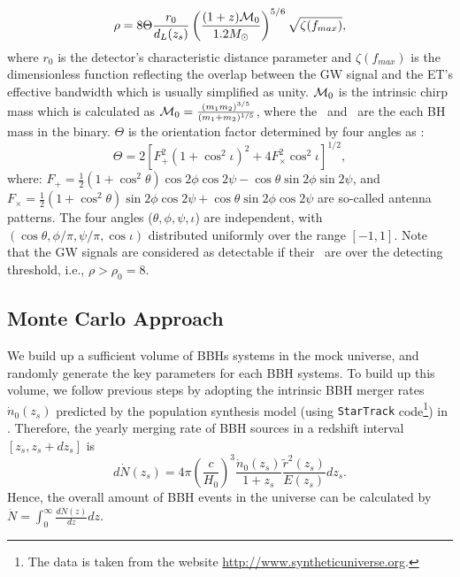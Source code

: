 \documentclass[twocolumn]{aastex62}
\begin{document}
\begin{equation} \label{SNR}
\rho = 8 \Theta \frac{r_0}{d_L(z_s)} \left( \frac{(1+z){\cal M}_0}{1.2 M_{\odot}} \right)^{5/6}
\sqrt {\zeta(f_{max})},
\end{equation}
where $r_0$ is the detector's characteristic distance parameter and $\zeta(f_{max})$ is the dimensionless function reflecting the overlap between the GW signal and the ET's effective bandwidth which is usually simplified as unity. ${\cal M}_0$ is the intrinsic chirp mass which is calculated as $ {\cal M}_0 = \frac{(m_1m_2)^{3/5}}{(m_1+m_2)^{1/5}}$, where the \mone\ and \mtwo\ are the each BH mass in the binary. $\Theta$ is the orientation factor determined by four angles as \citep{Finn93}:
 \begin{equation} \label{Theta}
 \Theta = 2 [ F_{+}^2(1 + \cos^2{\iota} )^2 + 4 F_{\times}^2 \cos^2{\iota} ]^{1/2},
 \end{equation}
where: $F_{+} = \frac{1}{2} (1 + \cos^2{\theta}) \cos{2\phi} \cos{2 \psi} - \cos{\theta} \sin{2 \phi} \sin{ 2 \psi}$, and
$F_{\times} = \frac{1}{2} (1 + \cos^2{\theta}) \sin{2\phi} \cos{2 \psi} + \cos{\theta} \sin{2 \phi} \cos{ 2 \psi}$ are so-called antenna patterns. The four angles ($\theta, \phi, \psi, \iota$) are independent, with $(\cos\theta, \phi/\pi, \psi/\pi, \cos\iota)$ distributed uniformly over the range $[-1, 1]$. Note that the GW signals are considered as detectable if their \snr\ are over the detecting threshold, i.e., $\rho > \rho_0 = 8$.

\subsection{Monte Carlo Approach} \label{MC}
We build up a sufficient volume of BBHs systems in the mock universe, and randomly generate the key parameters for each BBH systems. To build up this volume, we follow previous steps by adopting the intrinsic BBH merger rates $\dot{n}_{0}(z_{s})$ predicted by the population synthesis model (using {\tt StarTrack} code\footnote{The data is taken from the website \url{http://www.syntheticuniverse.org}.}) in \citet{Dominik13}. Therefore, the yearly  merging rate of BBH sources in a redshift interval  $[z_{s}, z_{s}+dz_{s}]$ is 
 \begin{equation}
 d\dot{N} (z_s)=4\pi\left(\frac{c}{H_{0}}\right)^3\frac{\dot{n}_{0}(z_{s})}{1+z_{s}}\frac{\tilde{r}^2(z_{s})}{E(z_{s})}dz_{s}. 
 \end{equation}
Hence, the overall amount of BBH events in the universe can be calculated by ${\dot N} = \int_0^{ \infty} \frac{d {\dot N (z)}}{dz} dz$.
\end{document}
